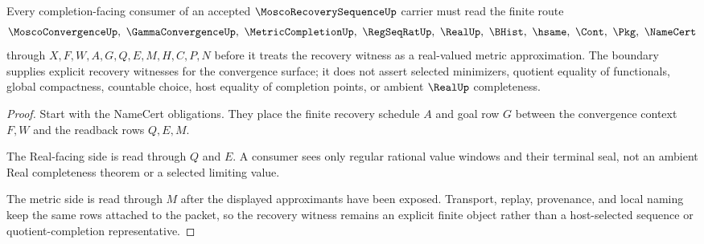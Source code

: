 \begin{theorem}
\label{thm:mosco-recovery-sequence-real-metric-boundary}
Every completion-facing consumer of an accepted $\MoscoRecoverySequenceUp$ carrier must read the finite route
$$
\MoscoConvergenceUp,\ \GammaConvergenceUp,\ \MetricCompletionUp,\ \RegSeqRatUp,\ \RealUp,\ \BHist,\ \hsame,\ \Cont,\ \Pkg,\ \NameCert
$$
through $X,F,W,A,G,Q,E,M,H,C,P,N$ before it treats the recovery witness as a real-valued metric approximation. The boundary supplies explicit recovery witnesses for the convergence surface; it does not assert selected minimizers, quotient equality of functionals, global compactness, countable choice, host equality of completion points, or ambient $\RealUp$ completeness.
\end{theorem}
\begin{proof}
Start with the NameCert obligations. They place the finite recovery schedule $A$ and goal row $G$ between the convergence context $F,W$ and the readback rows $Q,E,M$.

The Real-facing side is read through $Q$ and $E$. A consumer sees only regular rational value windows and their terminal seal, not an ambient Real completeness theorem or a selected limiting value.

The metric side is read through $M$ after the displayed approximants have been exposed. Transport, replay, provenance, and local naming keep the same rows attached to the packet, so the recovery witness remains an explicit finite object rather than a host-selected sequence or quotient-completion representative.
\end{proof}





